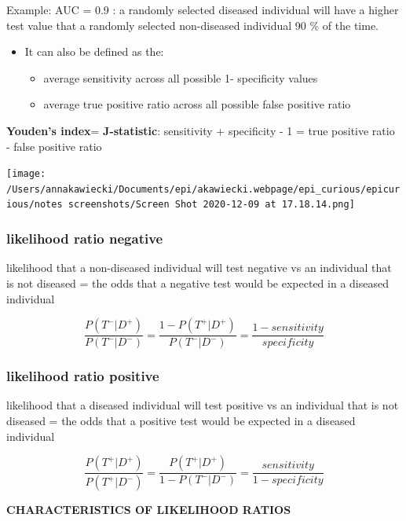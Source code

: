 \documentclass[
]{article}
\providecommand{\tightlist}{%
  \setlength{\itemsep}{0pt}\setlength{\parskip}{0pt}}
\begin{document}
Example: AUC = 0.9 : a randomly selected diseased individual will have a
higher test value that a randomly selected non-diseased individual 90 \%
of the time.

\begin{itemize}
\tightlist
\item
  It can also be defined as the:

  \begin{itemize}
  \tightlist
  \item
    average sensitivity across all possible 1- specificity values
  \item
    average true positive ratio across all possible false positive ratio
  \end{itemize}
\end{itemize}

\textbf{Youden's index}= \textbf{J-statistic}: sensitivity + specificity
- 1 = true positive ratio - false positive ratio

\texttt{[image: /Users/annakawiecki/Documents/epi/akawiecki.webpage/epi\_curious/epicurious/notes screenshots/Screen Shot 2020-12-09 at 17.18.14.png]}

\hypertarget{likelihood-ratio-negative}{%
\subsubsection{likelihood ratio
negative}\label{likelihood-ratio-negative}}

likelihood that a non-diseased individual will test negative vs an
individual that is not diseased = the odds that a negative test would be
expected in a diseased individual

\[\frac{P(T^-|D^+)}{P(T^-|D^-)}= \frac{1-P(T^+ | D^+)}{P(T^- | D^-)}= \frac{1-sensitivity}{specificity}\]

\hypertarget{likelihood-ratio-positive}{%
\subsubsection{likelihood ratio
positive}\label{likelihood-ratio-positive}}

likelihood that a diseased individual will test positive vs an
individual that is not diseased = the odds that a positive test would be
expected in a diseased individual

\[\frac{P(T^+|D^+)}{P(T^+|D^-)}= \frac{P(T^+ | D^+)}{1-P(T^- | D^-)}= \frac{sensitivity}{1-specificity}\]

\textbf{CHARACTERISTICS OF LIKELIHOOD RATIOS}
\end{document}
